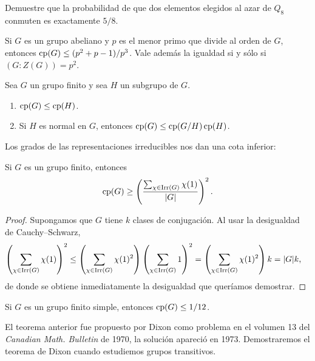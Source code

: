 \begin{exercise}
Demuestre que la probabilidad de que dos elementos elegidos al azar de $Q_8$ 
conmuten es exactamente $5/8$. 
\end{exercise}

\begin{exercise}
Si $G$ es un grupo abeliano y $p$ es el menor primo que divide al orden de $G$, entonces
$\operatorname{cp}(G)\leq (p^2+p-1)/p^3$. Vale además la igualdad si y sólo si $(G:Z(G))=p^2$. 
\end{exercise}

\begin{exercise}
Sea $G$ un grupo finito y sea $H$ un subgrupo de $G$. 
\begin{enumerate}
    \item $\operatorname{cp}(G)\leq\operatorname{cp}(H)$.
    \item Si $H$ es normal en $G$, entonces $\operatorname{cp}(G)\leq\operatorname{cp}(G/H)\operatorname{cp}(H)$.
\end{enumerate}
\end{exercise}

Los grados de las representaciones irreducibles nos dan una cota inferior:

\begin{proposition}
Si $G$ es un grupo finito, entonces
\[
\operatorname{cp}(G)\geq\left(\frac{\sum_{\chi\in\operatorname{Irr}(G)}\chi(1)}{|G|}\right)^2.
\]
\end{proposition}

\begin{proof}
Supongamos que $G$ tiene $k$ clases de conjugación. 
Al usar la desigualdad de Cauchy--Schwarz, 
\begin{align*}
    \left(\sum_{\chi\in\operatorname{Irr}(G)}\chi(1)\right)^2
    &\leq\left(\sum_{\chi\in\operatorname{Irr}(G)}\chi(1)^2\right)\left(\sum_{\chi\in\operatorname{Irr}(G)}1\right)^2
    =\left(\sum_{\chi\in\operatorname{Irr}(G)}\chi(1)^2\right)k=|G|k,
\end{align*}
de donde se obtiene inmediatamente la desigualdad que queríamos demostrar.
\end{proof}

\begin{theorem}[Dixon]
Si $G$ es un grupo finito simple, entonces $\operatorname{cp}(G)\leq1/12$.
\end{theorem}

El teorema anterior fue propuesto por Dixon como problema en el 
volumen 13 del \emph{Canadian Math. Bulletin} de 1970, 
la solución apareció en 1973. Demostraremos el teorema de Dixon 
cuando estudiemos grupos transitivos.

